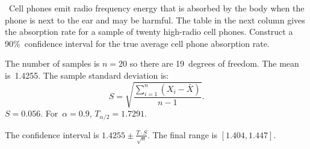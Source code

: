 \begin{problem}
  ~Cell phones emit radio frequency energy that is absorbed by the body when the phone is next to the ear and may be harmful.  The table in the next column gives the absorption rate for a sample of twenty high-radio cell phones.  Construct a 90\%~confidence interval for the true average cell phone absorption rate.
\end{problem}

The number of samples is ${n=20}$ so there are 19~degrees of freedom.  The mean is~1.4255.  The sample standard deviation is:
\begin{equation}\label{eq:SampleStdDev}
  S = \sqrt{\frac{\sum_{i=1}^{n} (X_i - \bar{X})}{n - 1}}\text{.}
\end{equation}
\noindent
${S = 0.056}$. For~${\alpha = 0.9}$, ${T_{\alpha / 2} = 1.7291}$.

The confidence interval is ${1.4255 \pm \frac{T \cdot S}{\sqrt{n}}}$.  The final range is ${[1.404,1.447]}$.

